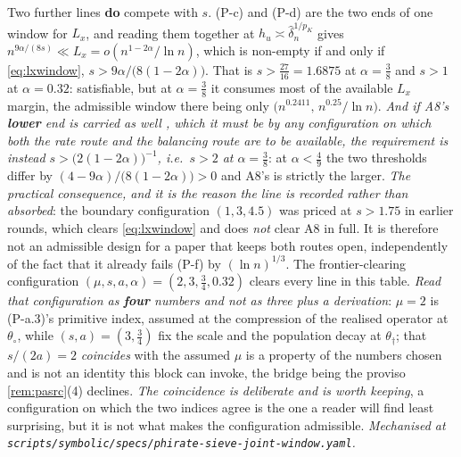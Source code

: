 Two further lines \textbf{do} compete with $s$. (P-c) and (P-d) are the two ends of one window for
$L_x$, and reading
them together at $h_u\asymp\hat\delta_n^{1/p_K}$ gives $n^{9\alpha/(8s)}\ll L_x=o(n^{1-2\alpha}/\ln n)$,
which is non-empty if and only if \eqref{eq:lxwindow}, $s>9\alpha/\big(8(1-2\alpha)\big)$. That is
$s>\tfrac{27}{16}=1.6875$ at $\alpha=\tfrac38$ and $s>1$ at $\alpha=0.32$: satisfiable, but at
$\alpha=\tfrac38$ it consumes most of the available $L_x$ margin, the admissible window there being
only $\big(n^{0.2411},\,n^{0.25}/\ln n\big)$. \emph{And if A8's \textbf{lower} end is carried as well
, which it must be by any configuration on which both the rate route and the balancing route are to
be available, the requirement is instead $s>\big(2(1-2\alpha)\big)^{-1}$, i.e.\ $s>2$ at
$\alpha=\tfrac38$}: at $\alpha<\tfrac49$ the two thresholds differ by
$(4-9\alpha)/\big(8(1-2\alpha)\big)>0$ and A8's is strictly the larger.
\emph{The practical consequence, and it is the reason the line is recorded rather than absorbed}: the
boundary configuration $(1,3,4.5)$ was priced at $s>1.75$ in earlier rounds, which clears
\eqref{eq:lxwindow} and does \emph{not} clear A8 in full. It is therefore not an admissible design for
a paper that keeps both routes open, independently of the fact that it already fails (P-f) by
$(\ln n)^{1/3}$. The frontier-clearing configuration $(\mu,s,a,\alpha)=(2,3,\tfrac34,0.32)$ clears
every line in this table. \emph{Read that configuration as \textbf{four} numbers and not as three plus a
derivation}: $\mu=2$ is (P-a.3)'s primitive index, assumed at the compression of the realised operator at
$\theta_\circ$, while $(s,a)=(3,\tfrac34)$ fix the scale and the population decay at $\theta_\dagger$; that
$s/(2a)=2$ \emph{coincides} with the assumed $\mu$ is a property of the numbers chosen and is not an
identity this block can invoke, the bridge being the proviso \cref{rem:pasrc}\textup{(4)} declines. \emph{The
coincidence is deliberate and is worth keeping}, a configuration on which the two indices agree is the
one a reader will find least surprising, but it is not what makes the configuration admissible.
\emph{Mechanised at \texttt{scripts/symbolic/specs/phirate-sieve-joint-window.yaml}.}

